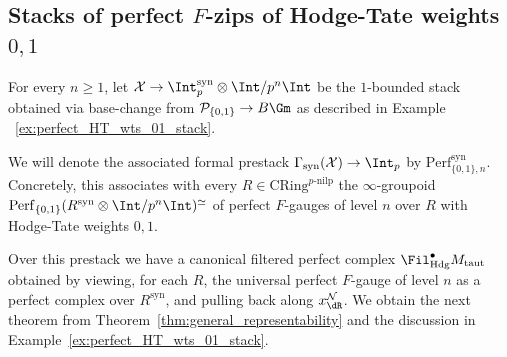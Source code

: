 \documentclass[10pt]{amsart}
\begin{document}
\subsection{Stacks of perfect $F$-zips of Hodge-Tate weights $0,1$}
\label{subsec:HTwts_01}

 

For every $n\ge 1$, let $\mathcal{X}\to \Int_p^{\mathrm{syn}}\otimes\Int/p^n\Int$ be the $1$-bounded stack obtained via base-change from $\mathcal{P}_{\{0,1\}}\to B\Gm$ as described in Example ~\ref{ex:perfect_HT_wts_01_stack}. 

We will denote the associated  formal prestack $\Gamma_{\mathrm{syn}}(\mathcal{X})\to \Int_p$ by $\mathrm{Perf}^{\mathrm{syn}}_{\{0,1\},n}$. Concretely, this associates with every $R\in \mathrm{CRing}^{p\text{-nilp}}$ the $\infty$-groupoid $\mathrm{Perf}_{\{0,1\}}(R^{\mathrm{syn}}\otimes\Int/p^n\Int)^{\simeq}$ of perfect $F$-gauges of level $n$ over $R$ with Hodge-Tate weights $0,1$. 

Over this prestack we have a canonical filtered perfect complex $\Fil^\bullet_{\mathrm{Hdg}}M_{\mathrm{taut}}$ obtained by viewing, for each $R$, the universal perfect $F$-gauge of level $n$ as a perfect complex over $R^{\mathrm{syn}}$, and pulling back along $x^{\mathcal{N}}_{\dR}$. We obtain the next theorem from Theorem~\ref{thm:general_representability} and the discussion in Example~\ref{ex:perfect_HT_wts_01_stack}.
\end{document}
